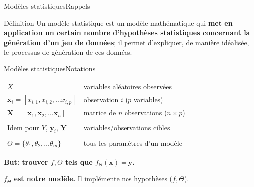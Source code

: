 \documentclass[12pt,dvipsnames,aspectratio=169]{beamer}
\newcommand{\x}[0]{\mathbf{x}}
\newcommand{\X}[0]{\mathbf{X}}
\newcommand{\y}[0]{\mathbf{y}}
\newcommand{\Y}[0]{\mathbf{Y}}
\begin{document}

    

\begin{frame}{Modèles statistiques}{Rappels}

    \begin{block}{Définition}
        \justifying
        Un modèle statistique est un modèle mathématique qui \textbf{met en application un certain nombre d'hypothèses statistiques concernant la génération d'un jeu de données}; il permet d'expliquer, de manière idéalisée, le processus de génération de ces données.
    \end{block}
    
\end{frame}


\begin{frame}{Modèles statistiques}{Notations}

    \begin{table}[]
        \centering
        \begin{tabular}{ll}
             $X$ & variables aléatoires observées \\
             $\x_i = [x_{i,1}, x_{i,2}, \dots x_{i,p}]$ & observation $i$ ($p$ variables) \\
             $\X = [\x_1, \x_2, \dots \x_n]$ & matrice de $n$ observations ($n \times p$)\\
             & \\
             Idem pour $Y$, $\y_i$, $\Y$ & variables/observations cibles \\
             & \\
             $\Theta = \{\theta_1, \theta_2, \dots \theta_m\}$ & tous les paramètres d'un modèle
        \end{tabular}
    \end{table}

    \textbf{But: trouver $f, \Theta$ tels que $f_\Theta(\x) = \y$.}

    \textbf{$f_\Theta$ est notre modèle.} Il implémente nos hypothèses ($f, \Theta$).

\end{frame}
\end{document}
